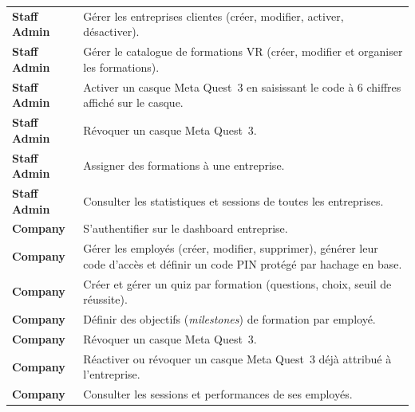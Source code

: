 {\begin{longtable}{
    >{\raggedright\arraybackslash}p{3cm}
    >{\raggedright\arraybackslash}p{10.7cm}
}
\textbf{Staff Admin} &
Gérer les entreprises clientes
(créer, modifier, activer, désactiver).
\\

\textbf{Staff Admin} &
Gérer le catalogue de formations VR
(créer, modifier et organiser les formations).
\\

\textbf{Staff Admin} &
Activer un casque Meta Quest~3 en saisissant le code à 6 chiffres
affiché sur le casque.
\\

\textbf{Staff Admin} &
Révoquer un casque Meta Quest~3.
\\

\textbf{Staff Admin} &
Assigner des formations à une entreprise.
\\

\textbf{Staff Admin} &
Consulter les statistiques et sessions de toutes les entreprises.
\\

\midrule


\textbf{Company} &
S'authentifier sur le dashboard entreprise.
\\

\textbf{Company} &
Gérer les employés (créer, modifier, supprimer), générer leur code
d'accès et définir un code PIN protégé par hachage en base.
\\

\textbf{Company} &
Créer et gérer un quiz par formation
(questions, choix, seuil de réussite).
\\

\textbf{Company} &
Définir des objectifs (\textit{milestones}) de formation par employé.
\\

\textbf{Company} &
Révoquer un casque Meta Quest~3.
\\

\textbf{Company} &
Réactiver ou révoquer un casque Meta Quest~3
déjà attribué à l'entreprise.
\\

\textbf{Company} &
Consulter les sessions et performances de ses employés.
\\

\midrule



\end{longtable}}
